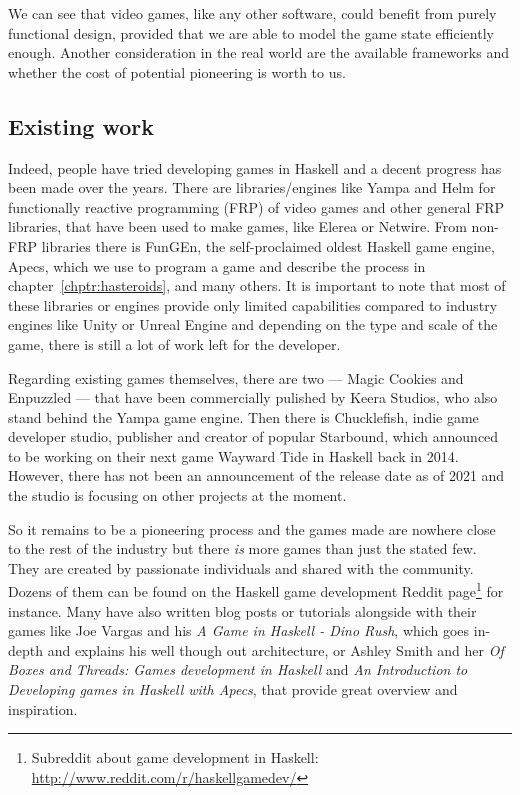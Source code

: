 \documentclass[
  digital, %
  color,   %
  table,   %
  oneside, %
  lof,     %
  lot,     %
]{fithesis3}
\begin{document}
We can see that video games, like any other software, could benefit from
purely functional design, provided that we are able to model the
game state efficiently enough. Another consideration in the real world
are the available frameworks and whether the cost of potential
pioneering is worth to us.


\subsection{Existing work}
\label{sect:existing}
Indeed, people have tried developing games in Haskell and a decent
progress has been made over the years. There are libraries/engines like Yampa\cite{yamparepo}
and Helm\cite{helmrepo} for functionally reactive programming (FRP) of video games and
other general FRP libraries, that have been used to make games, like Elerea\cite{elerearepo}
or Netwire\cite{netwirerepo}. From non-FRP libraries there is
FunGEn\cite{fungenrepo}, the self-proclaimed oldest Haskell game engine,
Apecs\cite{apecsrepo}, which we use to program a game and describe the process
in chapter~\ref{chptr:hasteroids}, and many others. It is important to note that
most of these libraries or engines provide only limited capabilities
compared to  industry engines like Unity or Unreal Engine
and depending on the type and scale of the game, there is still a lot
of work left for the developer.

Regarding existing games themselves, there are two --- Magic Cookies and
Enpuzzled --- that have been commercially pulished by Keera Studios,
who also stand behind the Yampa game engine\cite{keerastudios}.
Then there is Chucklefish, indie game developer studio, publisher and
creator of popular Starbound, which announced to be working on their next
game Wayward Tide in Haskell back in 2014\cite{waywardtide}. However, there
has not been an announcement of the release date as of 2021 and the studio is
focusing on other projects at the moment.

So it remains to be a pioneering process and the games made are nowhere close
to the rest of the industry but there \emph{is} more games than just the stated few.
They are created by passionate individuals and shared with the community. Dozens of them can be found
on the Haskell game development Reddit page\footnote{
Subreddit about game development in Haskell: \url{http://www.reddit.com/r/haskellgamedev/}
}
for instance. Many have also written blog posts or tutorials alongside with
their games like Joe Vargas and his \textit{A Game in Haskell - Dino Rush}\cite{dinorush},
which goes in-depth and explains his well though out architecture,
or Ashley Smith and her \textit{Of Boxes and Threads: Games development in Haskell}\cite{aashaskell}
and \textit{An Introduction to Developing games in Haskell with Apecs}\cite{aasapecs},
that provide great overview and inspiration.
\end{document}
